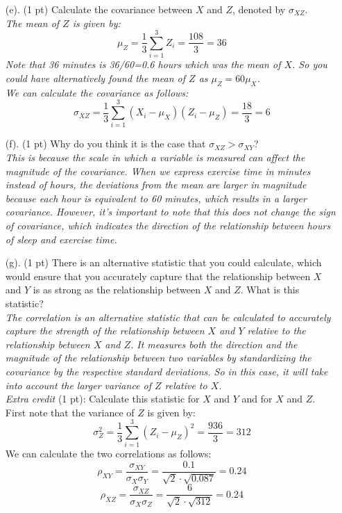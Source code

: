 \documentclass{./../../Latex/tests}
\begin{document}
\begin{enumerate}

\item[(e).] (1 pt) Calculate the covariance between $X$ and $Z$, denoted by $\sigma_{XZ}$. \\

\textit{The mean of $Z$ is given by:
$$ \mu_Z = \frac{1}{3} \sum_{i=1}^3 Z_i = \frac{108}{3} = 36 $$
Note that 36 minutes is 36/60=0.6 hours which was the mean of $X$. So you could have alternatively found the mean of $Z$ as $\mu_Z = 60 \mu_X$.} \\

\textit{We can calculate the covariance as follows:
$$ \sigma_{XZ} = \frac{1}{3} \sum_{i=1}^3 (X_i-\mu_X) (Z_i-\mu_Z) = \frac{18}{3} = 6 $$}
\item[(f).] (1 pt) Why do you think it is the case that $\sigma_{XZ}>\sigma_{XY}$? \\

\textit{This is because the scale in which a variable is measured can affect the magnitude of the covariance. When we express exercise time in minutes instead of hours, the deviations from the mean are larger in magnitude because each hour is equivalent to 60 minutes, which results in a larger covariance. However, it's important to note that this does not change the sign of covariance, which indicates the direction of the relationship between hours of sleep and exercise time. } \\

\item[(g).] (1 pt) There is an alternative statistic that you could calculate, which would ensure that you accurately capture that the relationship between $X$ and $Y$ is as strong as the relationship between $X$ and $Z$. What is this statistic? \\

\textit{The correlation is an alternative statistic that can be calculated to accurately capture the strength of the relationship between $X$ and $Y$ relative to the relationship between $X$ and $Z$. It measures both the direction and the magnitude of the relationship between two variables by standardizing the covariance by the respective standard deviations. So in this case, it will take into account the larger variance of $Z$ relative to $X$. }\\

\textit{Extra credit} (1 pt): Calculate this statistic for $X$ and $Y$ and for $X$ and $Z$. \\

First note that the variance of $Z$ is given by: 
$$ \sigma^2_Z= \frac{1}{3} \sum_{i=1}^3 (Z_i-\mu_Z)^2 = \frac{936}{3} = 312$$
We can calculate the two correlations as follows:
$$ \rho_{XY} = \frac{\sigma_{XY}}{\sigma_X \sigma_Y} = \frac{0.1}{\sqrt{2}\cdot\sqrt{0.087}} = 0.24 $$
$$ \rho_{XZ} = \frac{\sigma_{XZ}}{\sigma_X \sigma_Z} = \frac{6}{\sqrt{2}\cdot\sqrt{312}} = 0.24 $$
\end{enumerate}
\end{document}
